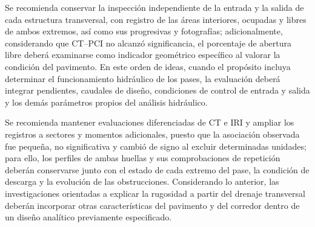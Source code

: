 Se recomienda conservar la inspección independiente de la entrada y la salida de cada estructura transversal, con registro de las áreas interiores, ocupadas y libres de ambos extremos, así como sus progresivas y fotografías; adicionalmente, considerando que CT--PCI no alcanzó significancia, el porcentaje de abertura libre deberá examinarse como indicador geométrico específico al valorar la condición del pavimento. En este orden de ideas, cuando el propósito incluya determinar el funcionamiento hidráulico de los pases, la evaluación deberá integrar pendientes, caudales de diseño, condiciones de control de entrada y salida y los demás parámetros propios del análisis hidráulico.

Se recomienda mantener evaluaciones diferenciadas de CT e IRI y ampliar los registros a sectores y momentos adicionales, puesto que la asociación observada fue pequeña, no significativa y cambió de signo al excluir determinadas unidades; para ello, los perfiles de ambas huellas y sus comprobaciones de repetición deberán conservarse junto con el estado de cada extremo del pase, la condición de descarga y la evolución de las obstrucciones. Considerando lo anterior, las investigaciones orientadas a explicar la rugosidad a partir del drenaje transversal deberán incorporar otras características del pavimento y del corredor dentro de un diseño analítico previamente especificado.

\endgroup
